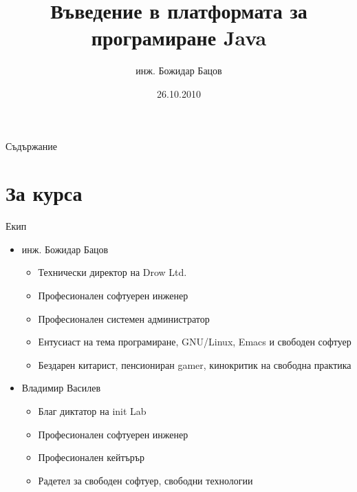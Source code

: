 \documentclass{beamer}
\title{Въведение в платформата за програмиране Java}
\author{инж. Божидар Бацов}
\institute{Drow Ltd.}
\date{26.10.2010}
\begin{document}
\begin{frame}
  \titlepage
\end{frame}

\begin{frame}{Съдържание}
  \tableofcontents[pausesections]
\end{frame}

\section{За курса}

\begin{frame}{Екип}
  \transdissolve
  \begin{itemize}
  \item инж. Божидар Бацов
    \begin{itemize}
    \item Технически директор на Drow Ltd.
    \item Професионален софтуерен инженер
    \item Професионален системен администратор
    \item Ентусиаст на тема програмиране, GNU/Linux, Emacs и свободен
      софтуер
    \item Бездарен китарист, пенсиониран gamer, кинокритик на свободна
      практика
    \end{itemize}
    \pause
  \item Владимир Василев
    \begin{itemize}
      \item Благ диктатор на init Lab
      \item Професионален софтуерен инженер
      \item Професионален кейтърър
      \item Радетел за свободен софтуер, свободни технологии
    \end{itemize}
  \end{itemize}
\end{frame}
\end{document}
